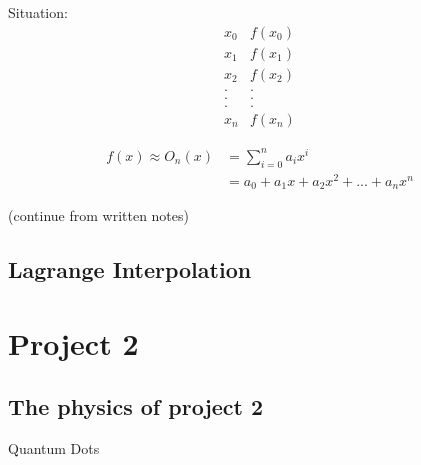 \documentclass[10pt]{article} %
\begin{document}
Situation:
\[ \begin{array}{cc}
x_0 & f(x_0) \\ x_1 & f(x_1) \\ x_2 & f(x_2) \\ .&. \\ .&. \\ .&. \\ x_n & f(x_n)
\end{array} \]

\begin{align*}
f(x) \approx O_n(x) &= \sum_{i=0}^n a_i x^i \\
& = a_0 + a_1x + a_2x^2 + ... + a_nx^n 
\end{align*}

(continue from written notes)

\subsection{Lagrange Interpolation}

\section{Project 2}

\subsection{The physics of project 2}

Quantum Dots
\end{document}
